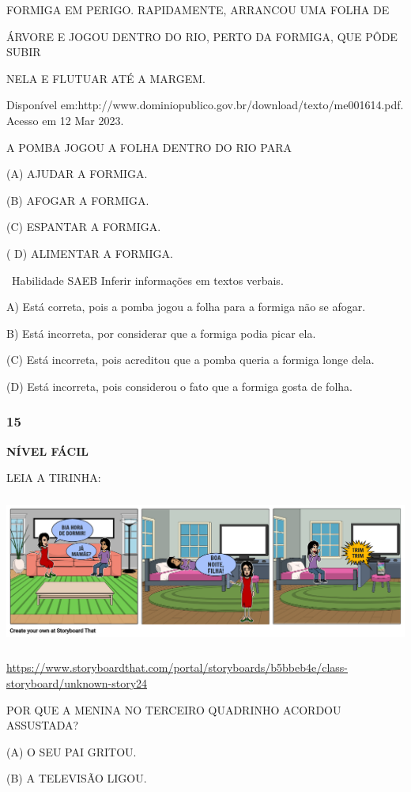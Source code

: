 FORMIGA EM PERIGO. RAPIDAMENTE, ARRANCOU UMA FOLHA DE

ÁRVORE E JOGOU DENTRO DO RIO, PERTO DA FORMIGA, QUE PÔDE SUBIR

NELA E FLUTUAR ATÉ A MARGEM.

Disponível
em:http://www.dominiopublico.gov.br/download/texto/me001614.pdf. Acesso
em 12 Mar 2023.

A POMBA JOGOU A FOLHA DENTRO DO RIO PARA

(A) AJUDAR A FORMIGA.

(B) AFOGAR A FORMIGA.

(C) ESPANTAR A FORMIGA.

( D) ALIMENTAR A FORMIGA.

~Habilidade SAEB Inferir informações em textos verbais.

A) Está correta, pois a pomba jogou a folha para a formiga não se
afogar.

B) Está incorreta, por considerar que a formiga podia picar ela.

(C) Está incorreta, pois acreditou que a pomba queria a formiga longe
dela.

(D) Está incorreta, pois considerou o fato que a formiga gosta de folha.

\subsubsection{15}\label{section-141}

\textbf{NÍVEL FÁCIL}

LEIA A TIRINHA:

\includegraphics[width=5.90556in,height=1.95694in]{media/image172.png}

\url{https://www.storyboardthat.com/portal/storyboards/b5bbeb4e/class-storyboard/unknown-story24}

POR QUE A MENINA NO TERCEIRO QUADRINHO ACORDOU ASSUSTADA?

(A) O SEU PAI GRITOU.

(B) A TELEVISÃO LIGOU.

